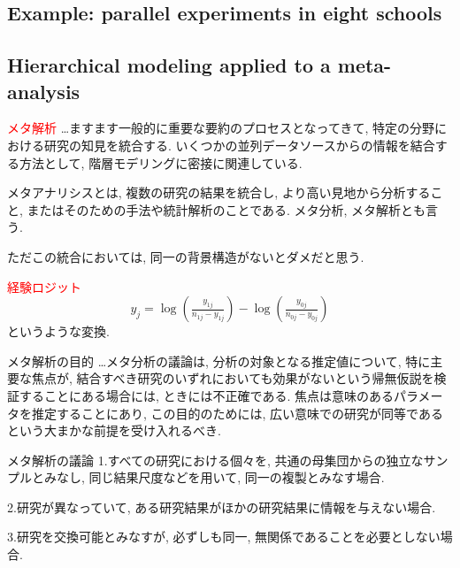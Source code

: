 \documentclass[11pt,a4pape,dvipdfmx]{jarticle}
\newcommand{\tcr}[1]{\textcolor{red}{#1}}
\begin{document}

\subsection{Example: parallel experiments in eight schools}



\subsection{Hierarchical modeling applied to a meta-analysis}
\begin{itembox}[l]{\tcr{メタ解析}}
…ますます一般的に重要な要約のプロセスとなってきて, 特定の分野における研究の知見を統合する.
いくつかの並列データソースからの情報を結合する方法として, 階層モデリングに密接に関連している.
\end{itembox}

メタアナリシスとは, 複数の研究の結果を統合し, より高い見地から分析すること, またはそのための手法や統計解析のことである.
メタ分析, メタ解析とも言う.

ただこの統合においては, 同一の背景構造がないとダメだと思う.



\begin{itembox}[l]{\tcr{経験ロジット}}
\[y_j=\log \left(\tfrac{y_{1j}}{n_{1j}-y_{1j}}\right)-\log \left(\tfrac{y_{0j}}{n_{0j}-y_{0j}}\right)\]
というような変換.
\end{itembox}



\begin{itembox}[l]{メタ解析の目的}
…メタ分析の議論は, 分析の対象となる推定値について, 特に主要な焦点が, 結合すべき研究のいずれにおいても効果がないという帰無仮説を検証することにある場合には, ときには不正確である.
焦点は意味のあるパラメータを推定することにあり, この目的のためには, 広い意味での研究が同等であるという大まかな前提を受け入れるべき.
\end{itembox}



\begin{itembox}[l]{メタ解析の議論}
1.すべての研究における個々を, 共通の母集団からの独立なサンプルとみなし, 同じ結果尺度などを用いて, 同一の複製とみなす場合.

2.研究が異なっていて, ある研究結果がほかの研究結果に情報を与えない場合.

3.研究を交換可能とみなすが, 必ずしも同一, 無関係であることを必要としない場合.
\end{itembox}
\end{document}
